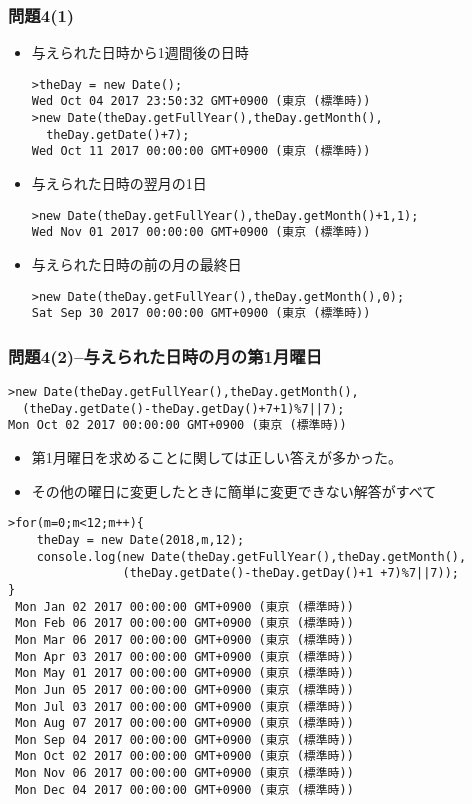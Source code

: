  \begin{frame}[containsverbatim]\scriptsize
   \frametitle{問題4(1)}
  \begin{itemize}
 \item 与えられた日時から1週間後の日時\\
\begin{Verbatim}
>theDay = new Date();
Wed Oct 04 2017 23:50:32 GMT+0900 (東京 (標準時))
>new Date(theDay.getFullYear(),theDay.getMonth(),
  theDay.getDate()+7);
Wed Oct 11 2017 00:00:00 GMT+0900 (東京 (標準時))
\end{Verbatim}
 \item 与えられた日時の翌月の1日\\
\begin{Verbatim}
>new Date(theDay.getFullYear(),theDay.getMonth()+1,1);
Wed Nov 01 2017 00:00:00 GMT+0900 (東京 (標準時))
\end{Verbatim}
 \item 与えられた日時の前の月の最終日\\
\begin{Verbatim}
>new Date(theDay.getFullYear(),theDay.getMonth(),0);
Sat Sep 30 2017 00:00:00 GMT+0900 (東京 (標準時))
\end{Verbatim}
  \end{itemize} 
  \end{frame}
  \begin{frame}[containsverbatim]\scriptsize
   \frametitle{問題4(2)--与えられた日時の月の第1月曜日}
\begin{Verbatim}
>new Date(theDay.getFullYear(),theDay.getMonth(),
  (theDay.getDate()-theDay.getDay()+7+1)%7||7);
Mon Oct 02 2017 00:00:00 GMT+0900 (東京 (標準時))
\end{Verbatim}
   \begin{itemize}
    \item 第1月曜日を求めることに関しては正しい答えが多かった。
    \item その他の曜日に変更したときに簡単に変更できない解答がすべて
   \end{itemize}
\begin{Verbatim}
>for(m=0;m<12;m++){
    theDay = new Date(2018,m,12);
    console.log(new Date(theDay.getFullYear(),theDay.getMonth(),
                (theDay.getDate()-theDay.getDay()+1 +7)%7||7));
}
 Mon Jan 02 2017 00:00:00 GMT+0900 (東京 (標準時))
 Mon Feb 06 2017 00:00:00 GMT+0900 (東京 (標準時))
 Mon Mar 06 2017 00:00:00 GMT+0900 (東京 (標準時))
 Mon Apr 03 2017 00:00:00 GMT+0900 (東京 (標準時))
 Mon May 01 2017 00:00:00 GMT+0900 (東京 (標準時))
 Mon Jun 05 2017 00:00:00 GMT+0900 (東京 (標準時))
 Mon Jul 03 2017 00:00:00 GMT+0900 (東京 (標準時))
 Mon Aug 07 2017 00:00:00 GMT+0900 (東京 (標準時))
 Mon Sep 04 2017 00:00:00 GMT+0900 (東京 (標準時))
 Mon Oct 02 2017 00:00:00 GMT+0900 (東京 (標準時))
 Mon Nov 06 2017 00:00:00 GMT+0900 (東京 (標準時))
 Mon Dec 04 2017 00:00:00 GMT+0900 (東京 (標準時))
\end{Verbatim}
  \end{frame}
